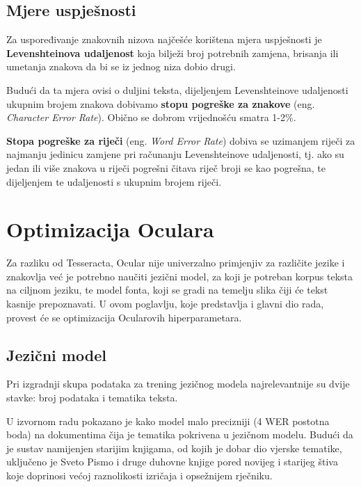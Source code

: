 \documentclass[zavrsnirad]{fer}
\begin{document}
\section{Mjere uspješnosti}

Za uspoređivanje znakovnih nizova najčešće korištena mjera uspješnosti je \textbf{Levenshteinova udaljenost} koja bilježi broj potrebnih zamjena, brisanja ili umetanja znakova da bi se iz jednog niza dobio drugi. \cite{Levenshtein1965}

Budući da ta mjera ovisi o duljini teksta, dijeljenjem Levenshteinove udaljenosti ukupnim brojem znakova dobivamo \textbf{stopu pogreške za znakove} (eng. \textit{Character Error Rate}). Obično se dobrom vrijednošću smatra 1-2\%.

\textbf{Stopa pogreške za riječi} (eng. \textit{Word Error Rate}) dobiva se uzimanjem riječi za najmanju jedinicu zamjene pri računanju Levenshteinove udaljenosti, tj. ako su jedan ili više znakova u riječi pogrešni čitava riječ broji se kao pogrešna, te dijeljenjem te udaljenosti s ukupnim brojem riječi.


\chapter{Optimizacija Oculara}
\label{pog:optimizacija_oculara}

Za razliku od Tesseracta, Ocular nije univerzalno primjenjiv za različite jezike i znakovlja već je potrebno naučiti jezični model, za koji je potreban korpus teksta na ciljnom jeziku, te model fonta, koji se gradi na temelju slika čiji će tekst kasnije prepoznavati. U ovom poglavlju, koje predstavlja i glavni dio rada, provest će se optimizacija Ocularovih hiperparametara.

\section{Jezični model}

Pri izgradnji skupa podataka za trening jezičnog modela najrelevantnije su dvije stavke: broj podataka i tematika teksta.

U izvornom radu pokazano je kako model malo precizniji (4 WER postotna boda) na dokumentima čija je tematika pokrivena u jezičnom modelu. Budući da je sustav namijenjen starijim knjigama, od kojih je dobar dio vjerske tematike, uključeno je Sveto Pismo i druge duhovne knjige pored novijeg i starijeg štiva koje doprinosi većoj raznolikosti izričaja i opsežnijem rječniku.
\cite{Berg2013}
\end{document}
